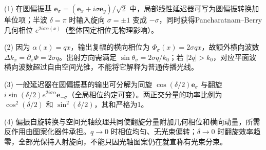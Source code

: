 (1) 在圆偏振基 \(\mathbf e_\sigma=(\mathbf e_x+i\sigma\mathbf e_y)/\sqrt2\) 中，局部线性延迟器可写为圆偏振转换加单位项；半波 \(\delta=\pi\) 时输入旋向 \(\sigma=\pm1\) 变成 \(-\sigma\)，同时获得Pancharatnam–Berry几何相位 \(e^{2i\sigma\alpha(x)}\)（整体固定相位无物理影响）。

(2) 因为 \(\alpha(x)=qx\)，输出复幅的横向相位为 \(\Phi_\sigma(x)=2\sigma qx\)，故额外横向波数 \(\Delta k_x=\partial_x\Phi=2\sigma q\)。出射方向需满足 \(\sin\theta_\sigma=2\sigma q/k_0\)；若 \(|2q|>k_0\)，对应平面波横向波数超过自由空间光锥，不能将它解释为普通传播光线。

(3) 一般延迟器在圆偏振基的输出可分解为同旋 \(\cos(\delta/2)\mathbf e_\sigma\) 与翻旋 \(i\sin(\delta/2)e^{2i\sigma\alpha}\mathbf e_{-\sigma}\)（全局相位约定可变）。两正交分量的功率比例为 \(\cos^2(\delta/2)\) 和 \(\sin^2(\delta/2)\)，其和严格为1。

(4) 偏振自旋转换与空间光轴纹理共同使翻旋分量附加几何相位和横向动量，所需反作用由图案化器件承担。\(q\to0\) 时相位均匀、无光束偏转；\(\delta\to0\) 时翻旋效率趋零，全部光保持入射旋向，不能只因光轴图案仍在就宣称有光束分束。
